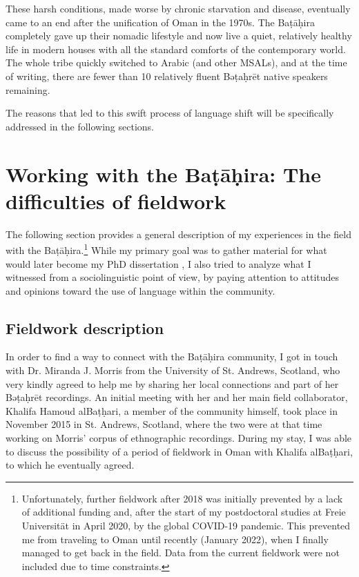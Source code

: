 \documentclass[output=paper]{langscibook}
\begin{document}
These harsh conditions, made worse by chronic starvation and disease, eventually came to an end after the unification of Oman in the 1970s. The Baṭāḥira completely gave up their nomadic lifestyle and now live a quiet, relatively healthy life in modern houses with all the standard comforts of the contemporary world. The whole tribe quickly switched to Arabic (and other MSALs), and at the time of writing, there are fewer than 10 relatively fluent Bəṭaḥrēt native speakers remaining.
 
The reasons that led to this swift process of language shift will be specifically addressed in the following sections.

\section{Working with the Baṭāḥira: The difficulties of fieldwork}
The following section provides a general description of my experiences in the field with the Baṭāḥira.\footnote{Unfortunately, further fieldwork after 2018 was initially prevented by a lack of additional funding and, after the start of my postdoctoral studies at Freie Universität in April 2020, by the global COVID-19 pandemic. This prevented me from traveling to Oman until recently (January 2022), when I finally managed to get back in the field. Data from the current fieldwork were not included due to time constraints.}  While my primary goal was to gather material for what would later become my PhD dissertation \citep{gasparini_bathari_2018}, I also tried to analyze what I witnessed from a sociolinguistic point of view, by paying attention to attitudes and opinions toward the use of language within the community.

\subsection{Fieldwork description}
In order to find a way to connect with the Baṭāḥira community, I got in touch with Dr. Miranda J. Morris from the University of St. Andrews, Scotland, who very kindly agreed to help me by sharing her local connections and part of her Bəṭaḥrēt recordings. An initial meeting with her and her main field collaborator, Khalifa Hamoud alBaṭḥari, a member of the community himself, took place in November 2015 in St. Andrews, Scotland, where the two were at that time working on Morris’ corpus of ethnographic recordings. During my stay, I was able to discuss the possibility of a period of fieldwork in Oman with Khalifa alBaṭḥari, to which he eventually agreed. 
\end{document}
